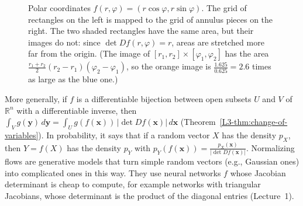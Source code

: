 \begin{figure}[ht]
    \centering
    \caption{Polar coordinates $f(r, \varphi) = (r\cos\varphi, r\sin\varphi)$. The grid of rectangles on the left is mapped to the grid of annulus pieces on the right. The two shaded rectangles have the same area, but their images do not: since $\det Df(r, \varphi) = r$, areas are stretched more far from the origin. (The image of $[r_1, r_2] \times [\varphi_1, \varphi_2]$ has the area $\frac{r_1 + r_2}{2}(r_2 - r_1)(\varphi_2 - \varphi_1)$, so the orange image is $\frac{1.625}{0.625} = 2.6$ times as large as the blue one.)}
    \label{L3-fig:polar}
\end{figure}

\begin{remark}\label{L3-rem:change-of-variables}
    More generally, if $f$ is a differentiable bijection between open subsets $U$ and $V$ of $\mathbb{R}^n$ with a differentiable inverse, then $\int_V g(\mathbf{y}) \, d\mathbf{y} = \int_U g(f(\mathbf{x})) \, |\det Df(\mathbf{x})| \, d\mathbf{x}$ (Theorem~\ref{L3-thm:change-of-variables}). In probability, it says that if a random vector $X$ has the density $p_X$, then $Y = f(X)$ has the density $p_Y$ with $p_Y(f(\mathbf{x})) = \frac{p_X(\mathbf{x})}{|\det Df(\mathbf{x})|}$. Normalizing flows are generative models that turn simple random vectors (e.g., Gaussian ones) into complicated ones in this way. They use neural networks $f$ whose Jacobian determinant is cheap to compute, for example networks with triangular Jacobians, whose determinant is the product of the diagonal entries (Lecture~1).
\end{remark}

